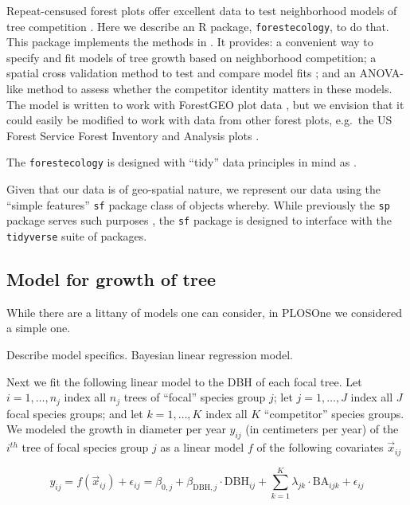 \documentclass[12pt]{article}
\begin{document}
Repeat-censused forest plots offer excellent data to test neighborhood
models of tree competition \citet{allen_permutation_2020}
\citet{canham_neighborhood_2006} \citet{uriarte_spatially_2004}. Here we
describe an R package, \texttt{forestecology}, to do that. This package
implements the methods in \citet{allen_permutation_2020}. It provides: a
convenient way to specify and fit models of tree growth based on
neighborhood competition; a spatial cross validation method to test and
compare model fits \citet{roberts_cross-validation_2017}; and an
ANOVA-like method to assess whether the competitor identity matters in
these models. The model is written to work with ForestGEO plot data
\citet{andersonteixeira_ctfs-forestgeo_2015}, but we envision that it
could easily be modified to work with data from other forest plots,
e.g.~the US Forest Service Forest Inventory and Analysis plots
\citet{smith_forest_2002}.

The \texttt{forestecology} is designed with ``tidy'' data principles in
mind as \citet{wickham_welcome_2019}.

Given that our data is of geo-spatial nature, we represent our data
using the ``simple features'' \texttt{sf} package class of objects
\citet{pebesma_simple_2018} whereby. While previously the \texttt{sp}
package serves such purposes \citet{pebesma_sp_2005}, the \texttt{sf}
package is designed to interface with the \texttt{tidyverse} suite of
packages.

\hypertarget{competition-model}{%
\subsection{Model for growth of tree}\label{competition-model}}

While there are a littany of models one can consider, in PLOSOne we
considered a simple one.

Describe model specifics. Bayesian linear regression model.

Next we fit the following linear model to the DBH of each focal tree.
Let \(i = 1, \ldots, n_j\) index all \(n_j\) trees of ``focal'' species
group \(j\); let \(j = 1, \ldots, J\) index all \(J\) focal species
groups; and let \(k = 1, \ldots, K\) index all \(K\) ``competitor''
species groups. We modeled the growth in diameter per year \(y_{ij}\)
(in centimeters per year) of the \(i^{th}\) tree of focal species group
\(j\) as a linear model \(f\) of the following covariates
\(\vec{x}_{ij}\)

\[
\newcommand{\dbh}{\text{DBH}}
\newcommand{\biomass}{\text{biomass}}
\newcommand{\BA}{\text{BA}}
y_{ij} = f(\vec{x}_{ij}) + \epsilon_{ij} = \beta_{0,j} + \beta_{\dbh,j} \cdot \dbh_{ij} + \sum_{k=1}^{K} \lambda_{jk} \cdot \BA_{ijk} + \epsilon_{ij}
\]
\end{document}
